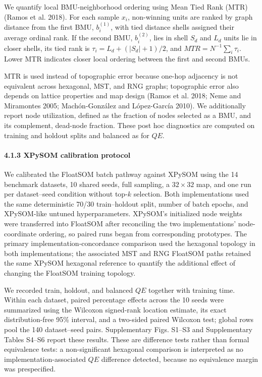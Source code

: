 \documentclass[
]{article}
\providecommand{\DIFadd}[1]{{\protect\color{blue} #1}} %
\providecommand{\DIFaddbegin}{} %
\begin{document}
\DIFaddbegin \DIFadd{We quantify local BMU-neighborhood ordering using Mean Tied Rank (MTR)
(Ramos et al. 2018). For each sample \(x_i\), non-winning units are
ranked by graph distance from the first BMU, \(b_i^{(1)}\), with tied
distance shells assigned their average ordinal rank. If the second BMU,
\(b_i^{(2)}\), lies in shell \(S_d\) and \(L_d\) units lie in closer
shells, its tied rank is \(\tau_i=L_d+(|S_d|+1)/2\), and
\(MTR=N^{-1}\sum_i \tau_i\). Lower MTR indicates closer local ordering
between the first and second BMUs.
}

\DIFadd{MTR is used instead of topographic error because one-hop adjacency is
not equivalent across hexagonal, MST, and RNG graphs; topographic error
also depends on lattice properties and map design (Ramos et al. 2018;
Neme and Miramontes 2005; Machón-González and López-García 2010). We
additionally report node utilization, defined as the fraction of nodes
selected as a BMU, and its complement, dead-node fraction. These post
hoc diagnostics are computed on training and holdout splits and balanced
as for \(QE\).
}

\paragraph{\DIFadd{4.1.3 XPySOM calibration
protocol}}\label{xpysom-calibration-protocol}

\DIFadd{We calibrated the FloatSOM batch pathway against XPySOM using the 14
benchmark datasets, 10 shared seeds, full sampling, a \(32\times32\)
map, and one run per dataset--seed condition without top-\(k\)
selection. Both implementations used the same deterministic 70/30
train--holdout split, number of batch epochs, and XPySOM-like untuned
hyperparameters. XPySOM's initialized node weights were transferred into
FloatSOM after reconciling the two implementations' node-coordinate
ordering, so paired runs began from corresponding prototypes. The
primary implementation-concordance comparison used the hexagonal
topology in both implementations; the associated MST and RNG FloatSOM
paths retained the same XPySOM hexagonal reference to quantify the
additional effect of changing the FloatSOM training topology.
}

\DIFadd{We recorded train, holdout, and balanced \(QE\) together with training
time. Within each dataset, paired percentage effects across the 10 seeds
were summarized using the Wilcoxon signed-rank location estimate, its
exact distribution-free 95\% interval, and a two-sided paired Wilcoxon
test; global rows pool the 140 dataset--seed pairs. Supplementary Figs.
S1--S3 and Supplementary Tables S4--S6 report these results. These are
difference tests rather than formal equivalence tests: a non-significant
hexagonal comparison is interpreted as no implementation-associated
\(QE\) difference detected, because no equivalence margin was
prespecified.
}
\end{document}

